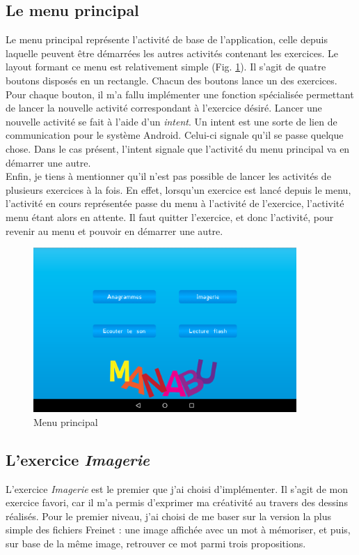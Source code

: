 \subsection{Le menu principal}
Le menu principal représente l'activité de base de l'application, celle depuis laquelle peuvent être démarrées les autres activités contenant les exercices. Le layout formant ce menu est relativement simple (Fig. \ref{menu}). Il s'agit de quatre boutons disposés en un rectangle. Chacun des boutons lance un des exercices.\\

Pour chaque bouton, il m'a fallu implémenter une fonction spécialisée permettant de lancer la nouvelle activité correspondant à l'exercice désiré.
Lancer une nouvelle activité se fait à l'aide d'un \textit{intent}. Un intent est une sorte de lien de communication pour le système Android. Celui-ci signale qu'il se passe quelque chose. Dans le cas présent, l'intent signale que l'activité du menu principal va en démarrer une autre.\\

Enfin, je tiens à mentionner qu'il n'est pas possible de lancer les activités de plusieurs exercices à la fois. En effet, lorsqu'un exercice est lancé depuis le menu, l'activité en cours représentée passe du menu à l'activité de l'exercice, l'activité menu étant alors en attente. Il faut quitter l'exercice, et donc l'activité, pour revenir au menu et pouvoir en démarrer une autre.

\begin{figure}[H]
\centering
\includegraphics[width=10cm]{img/menu.png}
\caption{Menu principal}
\label{menu}
\end{figure}

\subsection{L'exercice \textit{Imagerie}}
L'exercice \textit{Imagerie} est le premier que j'ai choisi d'implémenter. Il s'agit de mon exercice favori, car il m'a permis d'exprimer ma créativité au travers des dessins réalisés. Pour le premier niveau, j'ai choisi de me baser sur la version la plus simple des fichiers Freinet : une image affichée avec un mot à mémoriser, et puis, sur base de la même image, retrouver ce mot parmi trois propositions.\\

